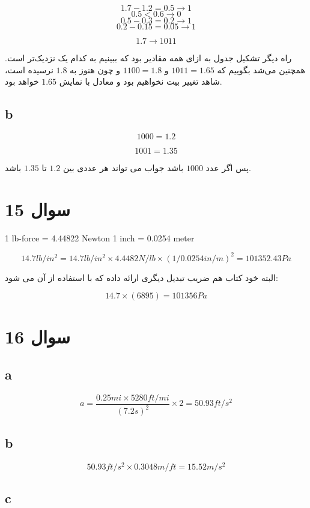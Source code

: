 \documentclass[12pt]{article}
\begin{document}
$$1.7 - 1.2 = 0.5 \rightarrow 1$$
$$0.5 < 0.6 \rightarrow 0$$
$$0.5 - 0.3 = 0.2 \rightarrow 1$$
$$0.2 - 0.15 = 0.05 \rightarrow 1$$

$$1.7 \rightarrow 1011$$

راه دیگر تشکیل جدول به ازای همه مقادیر بود که ببینیم به کدام یک نزدیک‌تر است. همچنین می‌شد بگوییم که $1011 = 1.65$ و $1100 = 1.8$ و چون هنوز به $1.8$ نرسیده است، شاهد تغییر بیت نخواهیم بود و معادل با نمایش $1.65$ خواهد بود.
\subsection*{b}

$$1000 = 1.2$$

$$1001 = 1.35$$

پس اگر عدد $1000$ باشد جواب می تواند هر عددی بین $1.2$ تا $1.35$ باشد.

\section*{سوال 15}

\begin{latin}
1 lb-force = 4.44822  Newton
1 inch = 0.0254 meter
\end{latin}

$$14.7 lb/in^2 = 14.7 lb/in^2 \times 4.4482 N/lb \times (1/0.0254 in/m)^2 = 101352.43 Pa$$

البته خود کتاب هم ضریب تبدیل دیگری ارائه داده که با استفاده از آن می شود:

$$14.7 \times (6895) = 101356 Pa $$

\section*{سوال 16}


\subsection*{a}
$$a= \frac{0.25 mi \times 5280 ft/mi}{ (7.2 s)^2 } \times 2 = 50.93 ft/s^2$$


\subsection*{b}
$$50.93 ft/s^2 \times 0.3048 m/ft = 15.52 m/s^2 $$

\subsection*{c}
\end{document}
